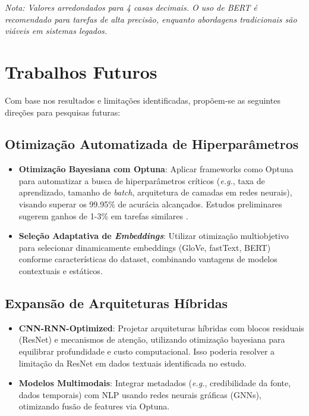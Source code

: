 \documentclass[conference]{IEEEtran}
\begin{document}
\vspace{0.3cm}
\noindent \footnotesize{\textit{Nota: Valores arredondados para 4 casas decimais. O uso de BERT é recomendado para tarefas de alta precisão, enquanto abordagens tradicionais são viáveis em sistemas legados.}}

\section{Trabalhos Futuros}
Com base nos resultados e limitações identificadas, propõem-se as seguintes direções para pesquisas futuras:

\subsection{Otimização Automatizada de Hiperparâmetros}
\begin{itemize}
    \item \textbf{Otimização Bayesiana com Optuna}: Aplicar frameworks como Optuna para automatizar a busca de hiperparâmetros críticos (\textit{e.g.}, taxa de aprendizado, tamanho de \textit{batch}, arquitetura de camadas em redes neurais), visando superar os 99.95\% de acurácia alcançados. Estudos preliminares sugerem ganhos de 1-3\% em tarefas similares \cite{optuna_ref}.
    
    \item \textbf{Seleção Adaptativa de \textit{Embeddings}}: Utilizar otimização multiobjetivo para selecionar dinamicamente embeddings (GloVe, fastText, BERT) conforme características do dataset, combinando vantagens de modelos contextuais e estáticos.
\end{itemize}

\vspace{8cm}

\subsection{Expansão de Arquiteturas Híbridas}
\begin{itemize}
    \item \textbf{CNN-RNN-Optimized}: Projetar arquiteturas híbridas com blocos residuais (ResNet) e mecanismos de atenção, utilizando otimização bayesiana para equilibrar profundidade e custo computacional. Isso poderia resolver a limitação da ResNet em dados textuais identificada no estudo.
    
    \item \textbf{Modelos Multimodais}: Integrar metadados (\textit{e.g.}, credibilidade da fonte, dados temporais) com NLP usando redes neurais gráficas (GNNs), otimizando fusão de features via Optuna.
\end{itemize}
\end{document}
